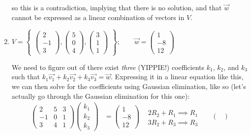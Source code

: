 \documentclass{article}
\begin{document}
\begin{enumerate}
\begin{solution}
        so this is a contradiction, implying that there is no solution, and that \(\overrightarrow{w}\) cannot be expressed as a linear combination of vectors in \(V\). 
    \end{solution}
    \item \(V = \begin{Bmatrix}
        \begin{pmatrix}
            2\\-1\\3
        \end{pmatrix},\begin{pmatrix}
            5\\0\\4
        \end{pmatrix},\begin{pmatrix}
            3\\1\\1
        \end{pmatrix}
    \end{Bmatrix}; \qquad \overrightarrow{w} = \begin{pmatrix}
        1\\-8\\12
    \end{pmatrix}\)\begin{solution}
        We need to figure out of there exist \textit{three} (YIPPIE!) coefficients \(k_1\), \(k_2\), and \(k_3\) such that \(k_1\overrightarrow{v_1} + k_2\overrightarrow{v_2} + k_3\overrightarrow{v_3} = \overrightarrow{w}\). Expressing it in a linear
        equation like this, we can then solve for the coefficients using Gaussian elimination, like so (let's actually go through the Gaussian elimination for this one):\begin{align*} 
            \begin{pmatrix}
                2&5&3\\-1&0&1\\3&4&1
            \end{pmatrix} \begin{pmatrix}
                k_1\\k_2\\k_3
            \end{pmatrix} &= \begin{pmatrix}
                1\\-8\\12
            \end{pmatrix} &\begin{matrix}\\2R_2 + R_1 \implies R_1\\3R_2 + R_3 \implies R_3 \end{matrix}&&\begin{pmatrix}

\end{pmatrix}
\end{align*}
\end{solution}
\end{enumerate}
\end{document}
